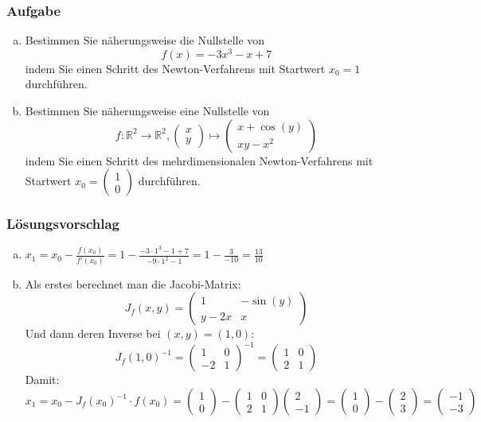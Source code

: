 \documentclass[a4paper,11pt]{scrartcl}
\newcounter{auf}
\newcommand{\Aufgabe}%
        {\addtocounter{auf}{1} \subsubsection*{\rmfamily  Aufgabe \theauf \hspace{1em}} }
\newcommand{\RR}{\mathbb{R}}
\begin{document}
\newpage
\Aufgabe

\begin{enumerate}[a)]
\item Bestimmen Sie näherungsweise die Nullstelle von 
$$
f(x)=-3x^3-x+7
$$
indem Sie einen Schritt des Newton-Verfahrens mit Startwert $x_0=1$ durchführen.
\item Bestimmen Sie näherungsweise eine Nullstelle von 
$$
f: \RR^2 \to \RR^2, \begin{pmatrix} x \\y \end{pmatrix} \mapsto \begin{pmatrix} x+\cos(y) \\ xy-x^2 \end{pmatrix}
$$
indem Sie einen Schritt des mehrdimensionalen Newton-Verfahrens mit Startwert $x_0=\begin{pmatrix} 1 \\0 \end{pmatrix}$ durchführen.
\end{enumerate}

%
%
\subsubsection*{Lösungsvorschlag}
\begin{enumerate}[a)]
\item $x_1=x_0-\frac{f(x_0)}{f'(x_0)}=1-\frac{-3\cdot 1^3-1+7}{-9\cdot 1^2-1}=1-\frac{3}{-10}=\frac{13}{10}$
\item Als erstes berechnet man die Jacobi-Matrix:
$$
J_f(x,y)=\begin{pmatrix}1 & - \sin(y) \\ y-2x & x \end{pmatrix}
$$
Und dann deren Inverse bei $(x,y)=(1,0)$:
$$
J_f(1,0)^{-1}=\begin{pmatrix}1 & 0 \\ -2 & 1 \end{pmatrix}^{-1}=\begin{pmatrix}1 & 0 \\ 2 & 1 \end{pmatrix}
$$
Damit:
$x_1=x_0-J_f(x_0)^{-1}\cdot f(x_0)=\begin{pmatrix} 1 \\ 0 \end{pmatrix}-\begin{pmatrix}1 & 0 \\ 2 & 1 \end{pmatrix}\begin{pmatrix} 2 \\ -1 \end{pmatrix}=\begin{pmatrix} 1 \\ 0 \end{pmatrix}-\begin{pmatrix} 2 \\ 3 \end{pmatrix}=\begin{pmatrix} -1 \\ -3 \end{pmatrix}$
\end{enumerate}
\end{document}
